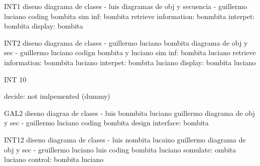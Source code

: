 INT1
    diseno
        diagrama de clases - luis
        diagramas de obj y secuencia - guillermo luciano
    coding
        bombita
    sim inf: bombita
    retrieve information: bonmbita
    interpet: bombita
    display: bombita

INT2
    diseno
        diagrama de clases - guillermo luciano bombita
        diagrama de obj y sec - guillermo luciano
    codign
        bombita y luciano
    sim inf: bombita luciano
    retrieve information: bonmbita luciano
    interpet: bombita luciano
    display: bombita luciano

INT 10

    decide: not imlpemented (dummy)

GAL2
    diesno
        diagraa de clases - luis bonmbita luciano guillermo
        diagrama de obj y sec - guillermo luciano
    coding
        bombita
    design interface: bombita

INT12
    diseno
        diagrama de clases - luis nombita lucaino guillermo
        diagrama de obj y sec - gruillermo luciano luis
    coding
        bombita luciano
    somulate: ombita luciano
    control: bombita luciano
